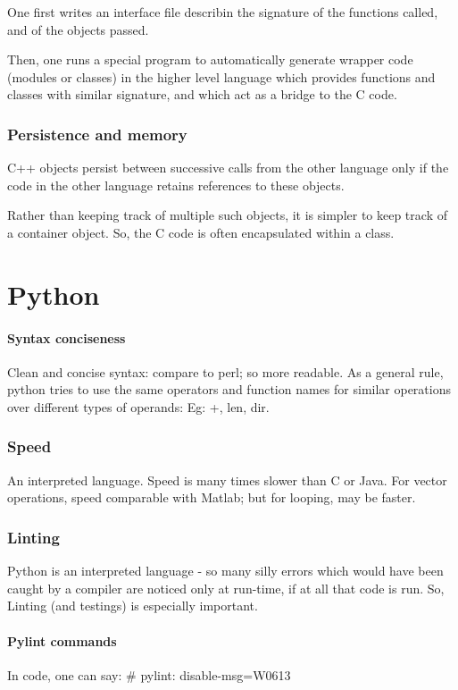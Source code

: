 \documentclass[oneside, article]{memoir}
\begin{document}
One first writes an interface file describin the signature of the functions called, and of the objects passed.

Then, one runs a special program to automatically generate wrapper code (modules or classes) in the higher level language which provides functions and classes with similar signature, and which act as a bridge to the C code.

\subsection{Persistence and memory}
C++ objects persist between successive calls from the other language only if the code in the other language retains references to these objects.

Rather than keeping track of multiple such objects, it is simpler to keep track of a container object. So, the C code is often encapsulated within a class.


\tbc

\chapter{Python}
\subsubsection{Syntax conciseness}
Clean and concise syntax: compare to perl; so more readable. As a general rule, python tries to use the same operators and function names for similar operations over different types of operands: Eg: +, len, dir.

\subsection{Speed}
An interpreted language. Speed is many times slower than C or Java. For vector operations, speed comparable with Matlab; but for looping, may be faster.

\subsection{Linting}
Python is an interpreted language - so many silly errors which would have been caught by a compiler are noticed only at run-time, if at all that code is run. So, Linting (and testings) is especially important.

\subsubsection{Pylint commands}
In code, one can say:
\# pylint: disable-msg=W0613
\end{document}
